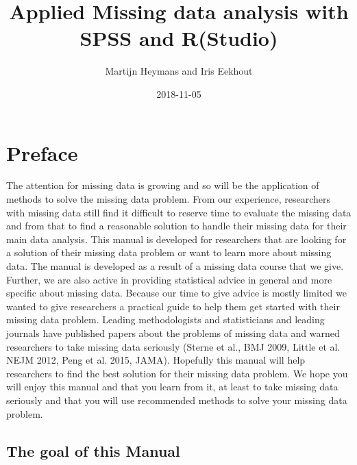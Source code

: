 \documentclass[]{book}
\title{Applied Missing data analysis with SPSS and R(Studio)}
\author{Martijn Heymans and Iris Eekhout}
\date{2018-11-05}
\theoremstyle{definition}
\theoremstyle{definition}
\theoremstyle{definition}
\theoremstyle{remark}
\begin{document}
\maketitle

{
\setcounter{tocdepth}{1}
\tableofcontents
}
\chapter*{Preface}\label{preface}

The attention for missing data is growing and so will be the application
of methods to solve the missing data problem. From our experience,
researchers with missing data still find it difficult to reserve time to
evaluate the missing data and from that to find a reasonable solution to
handle their missing data for their main data analysis. This manual is
developed for researchers that are looking for a solution of their
missing data problem or want to learn more about missing data. The
manual is developed as a result of a missing data course that we give.
Further, we are also active in providing statistical advice in general
and more specific about missing data. Because our time to give advice is
mostly limited we wanted to give researchers a practical guide to help
them get started with their missing data problem. Leading methodologists
and statisticians and leading journals have published papers about the
problems of missing data and warned researchers to take missing data
seriously (Sterne et al., BMJ 2009, Little et al. NEJM 2012, Peng et al.
2015, JAMA). Hopefully this manual will help researchers to find the
best solution for their missing data problem. We hope you will enjoy
this manual and that you learn from it, at least to take missing data
seriously and that you will use recommended methods to solve your
missing data problem.

\section{The goal of this Manual}\label{the-goal-of-this-manual}
\end{document}
